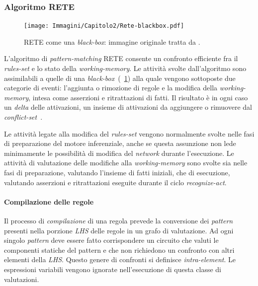 \subsubsection{Algoritmo RETE}\label{par:algoritmo-rete}

\begin{figure}[h]
\centering
\texttt{[image: Immagini/Capitolo2/Rete-blackbox.pdf]}
\caption[RETE come una \emph{black-box}]{RETE come una \emph{black-box}: immagine originale tratta da \cite{Doorenbos95productionmatching}.}\label{fig:rete-black-box}
\end{figure}

L'algoritmo di \emph{pattern-matching} RETE consente un confronto efficiente fra il \emph{rules-set} e lo stato della \emph{working-memory}. Le attività svolte dall'algoritmo sono assimilabili a quelle di una \emph{black-box}~(\figurename~\ref{fig:rete-black-box}) alla quale vengono sottoposte due categorie di eventi: l'aggiunta o rimozione di regole e la modifica della \emph{working-memory}, intesa come asserzioni e ritrattazioni di fatti. Il risultato è in ogni caso un \emph{delta} delle attivazioni, un insieme di attivazioni da aggiungere o rimuovere dal \emph{conflict-set}~\cite{Doorenbos95productionmatching}.

Le attività legate alla modifica del \emph{rules-set} vengono normalmente svolte nelle fasi di preparazione del motore inferenziale, anche se questa assunzione non lede minimamente le possibilità di modifica del \emph{network} durante l'esecuzione. Le attività di valutazione delle modifiche alla \emph{working-memory} sono svolte sia nelle fasi di preparazione, valutando l'insieme di fatti iniziali, che di esecuzione, valutando asserzioni e ritrattazioni eseguite durante il ciclo \emph{recognize-act}.

\paragraph{Compilazione delle regole}

Il processo di \emph{compilazione} di una regola prevede la conversione dei \emph{pattern} presenti nella porzione \emph{LHS} delle regole in un grafo di valutazione. Ad ogni singolo \emph{pattern} deve essere fatto corrispondere un circuito che valuti le componenti statiche del pattern e che non richiedono un confronto con altri elementi della \emph{LHS}. Questo genere di confronti si definisce \emph{intra-element}. Le espressioni variabili vengono ignorate nell'esecuzione di questa classe di valutazioni.

